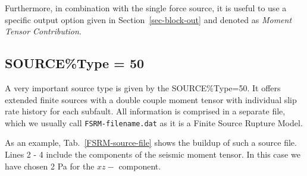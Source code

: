 \documentclass[12pt,twoside]{article}
\begin{document}
Furthermore, in combination with the single force source, it is useful to use a specific output option given in
Section~\ref{sec-block-out} and denoted as {\em Moment Tensor Contribution}.

\subsection{SOURCE\%Type = 50}
\noindent
\hypertarget{src50}{A very important} source type is given by the SOURCE\%Type=50. 
It offers extended finite sources with a double couple moment tensor with individual slip rate history for each subfault.
All information is comprised in a separate file, which we usually call {\tt FSRM-filename.dat} as it is a Finite Source Rupture Model.

\noindent
As an example, Tab.~\ref{FSRM-source-file} shows the buildup of such a source file.
Lines 2 - 4 include the components of the seismic moment tensor.
In this case we have chosen 2 Pa for the $xz-$ component.
\end{document}
